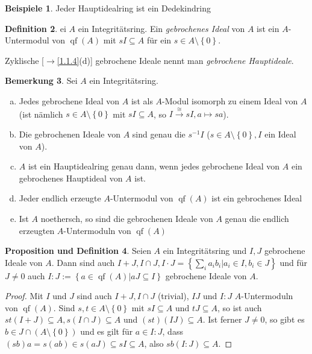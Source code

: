 \documentclass[
twoside=semi,
fontsize=12,
DIV=12, 
cleardoublepage=current,
leqno,
headings=optiontoheadandtoc, 
toc=idx
]{scrbook}
\newcommand{\set}[1]{\left\{ #1 \right\}}
\DeclareMathOperator{\qf}{qf}
\theoremstyle{definition}
\newtheorem{definition}{Definition}[section]
\newtheorem{bemerkung}[definition]{Bemerkung}
\newtheorem{beispiele}[definition]{Beispiele}
\newtheorem{prop-def}[definition]{Proposition und Definition}
\begin{document}
 	\begin{beispiele}\label{2.2.5}
 		Jeder Hauptidealring ist ein Dedekindring
 	\end{beispiele}
 
 	\begin{definition}\label{2.2.6}
 		ei $A$ ein Integrit\"atsring. Ein \emph{gebrochenes Ideal} von $A$ ist ein $A$-Untermodul von $\qf(A)$ mit $sI \subseteq A$ f\"ur ein $s \in A\setminus\set{0}$.
 		
 		Zyklische [$\to$\ref{1.1.4}(d)] gebrochene Ideale nennt man \emph{gebrochene Hauptideale}.
 	\end{definition}
 
 	\begin{bemerkung}\label{2.2.7}
 		Sei $A$ ein Integrit\"atsring.
 		\begin{enumerate}[(a)]
 			\item Jedes gebrochene Ideal von $A$ ist als $A$-Modul isomorph zu einem Ideal von $A$ (ist n\"amlich $s \in A \setminus \set{0}$ mit $sI \subseteq A$, so $I \xrightarrow{\cong} sI, a\mapsto sa$).
 			\item  Die gebrochenen Ideale von $A$ sind genau die $s^{-1}I$ ($s \in A \setminus \set{0}, I$ ein Ideal von $A$).
 			\item $A$ ist ein Hauptidealring genau dann, wenn jedes gebrochene Ideal von $A$ ein gebrochenes Hauptideal von $A$ ist.
 			\item Jeder endlich erzeugte $A$-Untermodul von $\qf(A)$ ist ein gebrochenes Ideal
 			\item Ist $A$ noethersch, so sind die gebrochenen Ideale von $A$ genau die endlich erzeugten $A$-Untermoduln von $\qf(A)$
 		\end{enumerate}
 	\end{bemerkung}
 
 	\begin{prop-def}\label{2.2.8}
 		Seien $A$ ein Integrit\"atsring und $I, J$ gebrochene Ideale von $A$. Dann sind auch $I+J, I \cap J, I \cdot J = \set{\sum_{i}a_ib_i|a_i \in I, b_i \in J}$ und f\"ur $J \neq 0$ auch 
 		$I:J := \set{a \in \qf(A)| aJ \subseteq I}$ gebrochene Ideale von $A$.
 		
 		\begin{proof}
 			Mit $I$ und $J$ sind auch $I + J, I \cap J$ (trivial), $IJ$ und $I:J$ $A$-Untermoduln von $\qf(A)$. Sind $s,t \in A \setminus \set{0}$ mit $sI \subseteq A$ und $tJ \subseteq A$, so ist auch $st(I+J) \subseteq A, s(I \cap J)\subseteq A$ und $(st)(IJ) \subseteq A$. Ist ferner $J \neq 0$, so gibt es $b \in J \cap (A \setminus \set{0})$ und es gilt f\"ur $a \in I:J$, dass $(sb)a = s(ab) \in s(aJ)\subseteq sI \subseteq A$, also $sb(I:J) \subseteq A$.
 		\end{proof}
 	\end{prop-def}
 
\end{document}
